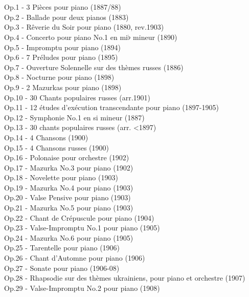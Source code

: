 \\
\\
Op.1 - 3 Pièces pour piano (1887/88)\\
Op.2 - Ballade pour deux pianos (1883)\\
Op.3 - Rêverie du Soir pour piano (1880, rev.1903)\\
Op.4 - Concerto pour piano No.1 en mi$\flat$ mineur (1890)\\
Op.5 - Impromptu pour piano (1894)\\
Op.6 - 7 Préludes pour piano (1895)\\
Op.7 - Ouverture Solennelle sur des thèmes russes (1886)\\
Op.8 - Nocturne pour piano (1898)\\
Op.9 - 2 Mazurkas pour piano (1898)\\
Op.10 - 30 Chants populaires russes (arr.1901)\\
Op.11 - 12 études d'exécution transcendante pour piano (1897-1905)\\
Op.12 - Symphonie No.1 en si mineur (1887)\\
Op.13 - 30 chants populaires russes (arr. <1897)\\
Op.14 - 4 Chansons (1900)\\
Op.15 - 4 Chansons russes (1900)\\
Op.16 - Polonaise pour orchestre (1902)\\
Op.17 - Mazurka No.3 pour piano (1902)\\
Op.18 - Novelette pour piano (1903)\\
Op.19 - Mazurka No.4 pour piano (1903)\\
Op.20 - Valse Pensive pour piano (1903)\\
Op.21 - Mazurka No.5 pour piano (1903)\\
Op.22 - Chant de Crépuscule pour piano (1904)\\
Op.23 - Valse-Impromptu No.1 pour piano (1905)\\
Op.24 - Mazurka No.6 pour piano (1905)\\
Op.25 - Tarentelle pour piano (1906)\\
Op.26 - Chant d'Automne pour piano (1906)\\
Op.27 - Sonate pour piano (1906-08)\\
Op.28 - Rhapsodie sur des thèmes ukrainiens, pour piano et orchestre (1907)\\
Op.29 - Valse-Impromptu No.2 pour piano (1908)\\
